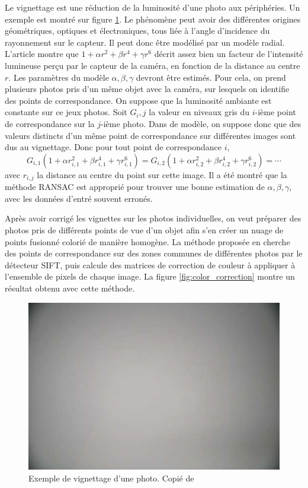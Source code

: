 \documentclass[a4paper,10pt]{scrreprt}
\begin{document}
Le vignettage est une réduction de la luminosité d'une photo aux périphéries. Un exemple est montré sur figure \ref{fig:vignetting}. Le phénomène peut avoir des différentes origines géométriques, optiques et électroniques, tous liée à l'angle d'incidence du rayonnement sur le capteur. Il peut donc être modélisé par un modèle radial. L'article montre que $1 + \alpha r^2 + \beta r^4 + \gamma r^6$ décrit assez bien un facteur de l'intensité lumineuse perçu par le capteur de la caméra, en fonction de la distance au centre $r$. Les paramètres du modèle $\alpha, \beta, \gamma$ devront être estimés. Pour cela, on prend plusieurs photos pris d'un même objet avec la caméra, sur lesquels on identifie des points de correspondance. On suppose que la luminosité ambiante est constante sur ce jeux photos. Soit $G_i,j$ la valeur en niveaux gris du $i$-ième point de correspondance sur la $j$-ième photo. Dans de modèle, on suppose donc que des valeurs distincts d'un même point de correspondance sur différentes images sont dus au vignettage. Donc pour tout point de correspondance $i$,
\begin{equation}
	G_{i,1} (1 + \alpha r_{i,1}^2 + \beta r_{i,1}^4 + \gamma r_{i,1}^6) = G_{i,2} (1 + \alpha r_{i,2}^2 + \beta r_{i,2}^4 + \gamma r_{i,2}^6) = \cdots
\end{equation}
avec $r_{i,j}$ la distance au centre du point sur cette image. Il a été montré que la méthode RANSAC est approprié pour trouver une bonne estimation de $\alpha, \beta, \gamma$, avec les données d'entré souvent erronés.

Après avoir corrigé les vignettes sur les photos individuelles, on veut préparer des photos pris de différents points de vue d'un objet afin s'en créer un nuage de points fusionné colorié de manière homogène. La méthode proposée en \cite{Giro2013} cherche des points de correspondance sur des zones communes de différentes photos par le détecteur SIFT, puis calcule des matrices de correction de couleur à appliquer à l'ensemble de pixels de chaque image. La figure \ref{fig:color_correction} montre un résultat obtenu avec cette méthode.

\begin{figure}[p]
\center
\includegraphics[width=.6\textwidth]{vignetting.png}
\caption{Exemple de vignettage d'une photo. Copié de \cite{Giro2013}}
\label{fig:vignetting}
\end{figure}
\end{document}
